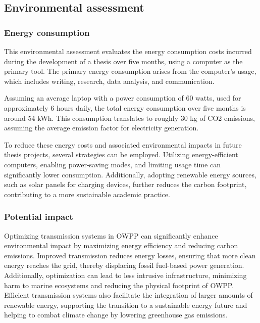 \documentclass[a4paper,11pt, titlepage, twoside]{article}
\begin{document}
\subsection{Environmental assessment}

\subsubsection{Energy consumption}

This environmental assessment evaluates the energy consumption costs incurred during
the development of a thesis over five months, using a computer as the primary tool. The primary energy consumption arises
from the computer's usage, which includes writing, research, data analysis, and communication.\par

Assuming an average laptop with a power consumption of 60 watts, used for approximately 6 hours daily, the total energy consumption
over five months is around 54 kWh. This consumption translates to roughly 30 kg of CO2 emissions, assuming the average emission
factor for electricity generation.\par

To reduce these energy costs and associated environmental impacts in future thesis projects, several strategies can be employed.
Utilizing energy-efficient computers, enabling power-saving modes, and limiting usage time can significantly lower consumption.
Additionally, adopting renewable energy sources, such as solar panels for charging devices, further reduces the carbon footprint,
contributing to a more sustainable academic practice.

\subsubsection{Potential impact}

Optimizing transmission systems in OWPP can significantly enhance environmental impact by maximizing energy efficiency
and reducing carbon emissions. Improved transmission reduces energy losses, ensuring that more clean energy reaches the grid, thereby displacing fossil
fuel-based power generation. Additionally, optimization can lead to less intrusive infrastructure, minimizing harm to marine ecosystems and reducing the physical footprint of OWPP.
Efficient transmission systems also facilitate the integration of larger amounts of renewable energy, supporting the transition to a sustainable energy future and helping to combat climate change by lowering
greenhouse gas emissions.
\end{document}
